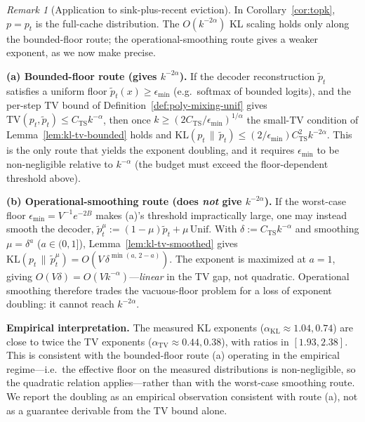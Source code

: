 \documentclass[11pt]{article}
\newcommand{\KLs}{\mathrm{KL}}
\newcommand{\TV}{\mathrm{TV}}
\theoremstyle{plain}
\theoremstyle{definition}
\theoremstyle{remark}
\newtheorem{remark}[theorem]{Remark}
\begin{document}
\begin{remark}[Application to sink-plus-recent eviction]
\label{rmk:application-sink}
In Corollary~\ref{cor:topk}, $p = p_t$ is the full-cache
distribution. The $O(k^{-2\alpha})$ KL scaling holds only along the
bounded-floor route; the operational-smoothing route gives a weaker
exponent, as we now make precise.

\textbf{(a) Bounded-floor route (gives $k^{-2\alpha}$).} If the
decoder reconstruction $\tilde p_t$ satisfies a uniform floor
$\tilde p_t(x) \geq \epsilon_{\min}$ (e.g.\ softmax of bounded
logits), and the per-step TV bound of Definition~\ref{def:poly-mixing-unif} gives
$\TV(p_t, \tilde p_t) \leq C_{\mathrm{TS}} k^{-\alpha}$, then once
$k \geq (2 C_{\mathrm{TS}}/\epsilon_{\min})^{1/\alpha}$ the small-TV
condition of Lemma~\ref{lem:kl-tv-bounded} holds and
$\KLs(p_t\,\|\,\tilde p_t) \leq (2/\epsilon_{\min})
C_{\mathrm{TS}}^2 k^{-2\alpha}$. This is the only route that yields
the exponent doubling, and it requires $\epsilon_{\min}$ to be
non-negligible relative to $k^{-\alpha}$ (the budget must exceed the
floor-dependent threshold above).

\textbf{(b) Operational-smoothing route (does \emph{not} give
$k^{-2\alpha}$).} If the worst-case floor
$\epsilon_{\min} = V^{-1}e^{-2B}$ makes (a)'s threshold impractically
large, one may instead smooth the decoder,
$\tilde p_t^{\mu} := (1-\mu)\tilde p_t + \mu\,\mathrm{Unif}$. With
$\delta := C_{\mathrm{TS}}k^{-\alpha}$ and smoothing $\mu = \delta^a$
($a \in (0,1]$), Lemma~\ref{lem:kl-tv-smoothed} gives
$\KLs(p_t\,\|\,\tilde p_t^{\mu}) = O(V\,\delta^{\min(a,\,2-a)})$.
The exponent is maximized at $a = 1$, giving $O(V\delta) =
O(V k^{-\alpha})$---\emph{linear} in the TV gap, not quadratic.
Operational smoothing therefore trades the vacuous-floor problem
for a loss of exponent doubling: it cannot reach $k^{-2\alpha}$.

\textbf{Empirical interpretation.} The measured KL exponents
($\alpha_{\KLs} \approx 1.04, 0.74$) are close to twice the TV
exponents ($\alpha_{\TV} \approx 0.44, 0.38$), with ratios in
$[1.93, 2.38]$. This is consistent with the bounded-floor route (a)
operating in the empirical regime---i.e.\ the effective floor on the
measured distributions is non-negligible, so the quadratic relation
applies---rather than with the worst-case smoothing route. We
report the doubling as an empirical observation consistent with
route (a), not as a guarantee derivable from the TV bound alone.
\end{remark}
\end{document}
